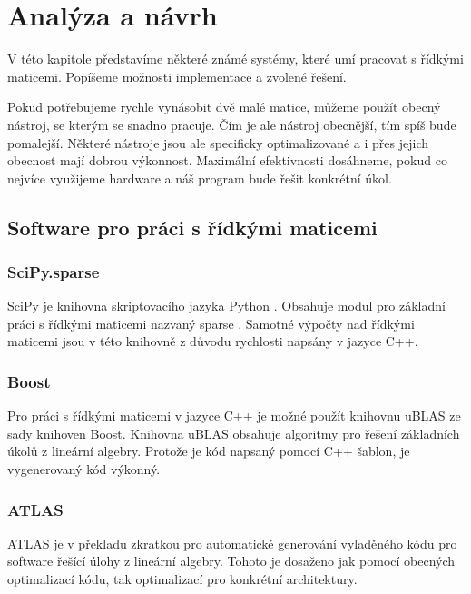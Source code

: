 \chapter{Analýza a návrh}

V této kapitole představíme některé známé systémy, které umí pracovat s řídkými maticemi. Popíšeme možnosti implementace a zvolené řešení.

Pokud potřebujeme rychle vynásobit dvě malé matice, můžeme použít obecný nástroj, se kterým se snadno pracuje. Čím je ale nástroj obecnější, tím spíš bude pomalejší. Některé nástroje jsou ale specificky optimalizované a i přes jejich obecnost mají dobrou výkonnost. Maximální efektivnosti dosáhneme, pokud co nejvíce využijeme hardware a náš program bude řešit konkrétní úkol. 

\section{Software pro práci s řídkými maticemi}

\subsection{SciPy.sparse}

SciPy je knihovna skriptovacího jazyka Python \cite{Python}. Obsahuje modul pro základní práci s řídkými maticemi nazvaný sparse \cite{scipy}. Samotné výpočty nad řídkými maticemi jsou v této knihovně z důvodu rychlosti napsány v jazyce C++.

\subsection{Boost}

Pro práci s řídkými maticemi v jazyce C++ je možné použít knihovnu uBLAS \cite{ublas} ze sady knihoven Boost\cite{boost}. Knihovna uBLAS obsahuje algoritmy pro řešení základních úkolů z lineární algebry. Protože je kód napsaný pomocí C++ šablon, je vygenerovaný kód výkonný.

\subsection{ATLAS}

ATLAS \cite{atlas} je v překladu zkratkou pro automatické generování vyladěného kódu pro software řešící úlohy z lineární algebry. Tohoto je dosaženo jak pomocí obecných optimalizací kódu, tak optimalizací pro konkrétní architektury.

